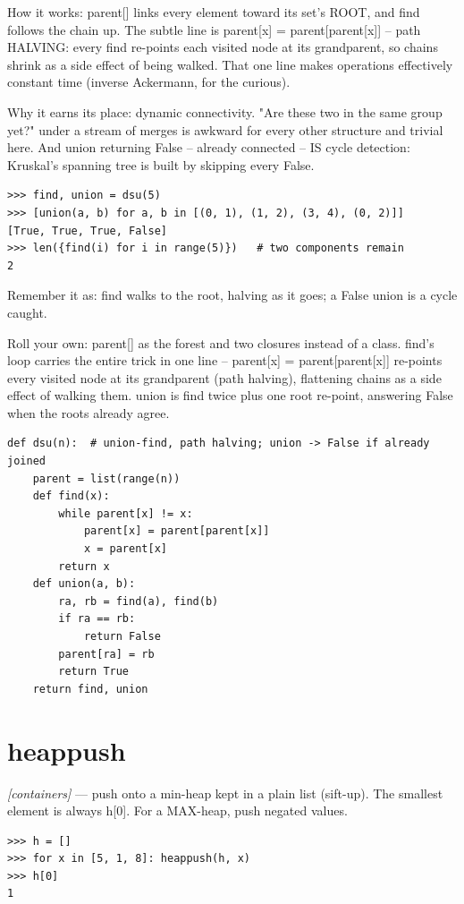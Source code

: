 \documentclass[11pt,letterpaper]{book}
\begin{document}
How it works: parent[] links every element toward its set's ROOT, and find follows the chain up. The subtle line is parent[x] = parent[parent[x]] -- path HALVING: every find re-points each visited node at its grandparent, so chains shrink as a side effect of being walked. That one line makes operations effectively constant time (inverse Ackermann, for the curious).


Why it earns its place: dynamic connectivity. "Are these two in the same group yet?" under a stream of merges is awkward for every other structure and trivial here. And union returning False -- already connected -- IS cycle detection: Kruskal's spanning tree is built by skipping every False.

\begin{lstlisting}[style=spec]
>>> find, union = dsu(5)
>>> [union(a, b) for a, b in [(0, 1), (1, 2), (3, 4), (0, 2)]]
[True, True, True, False]
>>> len({find(i) for i in range(5)})   # two components remain
2
\end{lstlisting}

Remember it as: find walks to the root, halving as it goes; a False union is a cycle caught.


Roll your own: parent[] as the forest and two closures instead of a class. find's loop carries the entire trick in one line -- parent[x] = parent[parent[x]] re-points every visited node at its grandparent (path halving), flattening chains as a side effect of walking them. union is find twice plus one root re-point, answering False when the roots already agree.

\begin{lstlisting}[style=code]
def dsu(n):  # union-find, path halving; union -> False if already joined
    parent = list(range(n))
    def find(x):
        while parent[x] != x:
            parent[x] = parent[parent[x]]
            x = parent[x]
        return x
    def union(a, b):
        ra, rb = find(a), find(b)
        if ra == rb:
            return False
        parent[ra] = rb
        return True
    return find, union
\end{lstlisting}

\section{heappush}
\noindent\textit{[containers]} --- push onto a min-heap kept in a plain list (sift-up). The smallest element is always h[0]. For a MAX-heap, push negated values.
\begin{lstlisting}[style=spec]
>>> h = []
>>> for x in [5, 1, 8]: heappush(h, x)
>>> h[0]
1
\end{lstlisting}
\end{document}
